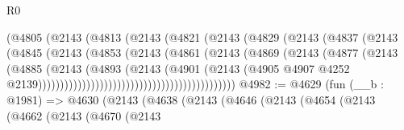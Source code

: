 \begin{lexlean}{R0}
\begin{coremodule}
                                        (@4805
                                          (@2143
                                            (@4813
                                              (@2143
                                                (@4821
                                                  (@2143
                                                    (@4829
                                                      (@2143
                                                        (@4837
                                                          (@2143
                                                            (@4845
                                                              (@2143
                                                                (@4853
                                                                  (@2143
                                                                    (@4861
                                                                      (@2143
                                                                        (@4869
                                                                          (@2143
                                                                            (@4877
                                                                              (@2143
                                                                                (@4885
                                                                                  (@2143
                                                                                    (@4893
                                                                                      (@2143
                                                                                        (@4901
                                                                                          (@2143
                                                                                            (@4905
                                                                                              @4907
                                                                                              @4252
                                                                                              @2139)))))))))))))))))))))))))))))))))))))))))))))
@4982 := @4629
    (fun (__b : @1981) =>
    @4630
      (@2143
        (@4638
          (@2143
            (@4646
              (@2143
                (@4654
                  (@2143
                    (@4662
                      (@2143
                        (@4670
                          (@2143

\end{coremodule}
\end{lexlean}
